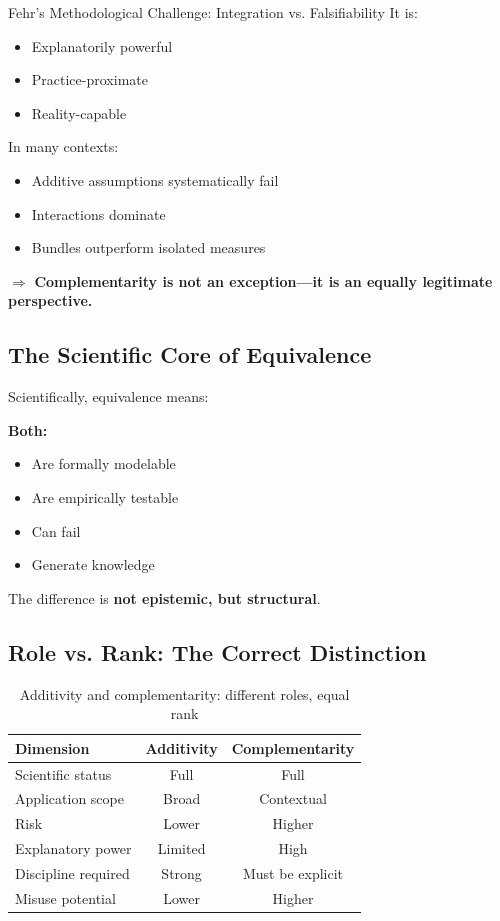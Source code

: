 \begin{chapter}{Fehr's Methodological Challenge: Integration vs. Falsifiability}
It is:
\begin{itemize}[noitemsep]
    \item Explanatorily powerful
    \item Practice-proximate
    \item Reality-capable
\end{itemize}

In many contexts:
\begin{itemize}[noitemsep]
    \item Additive assumptions systematically fail
    \item Interactions dominate
    \item Bundles outperform isolated measures
\end{itemize}

$\Rightarrow$ \textbf{Complementarity is not an exception---it is an equally legitimate perspective.}

\subsection{The Scientific Core of Equivalence}

Scientifically, equivalence means:

\textbf{Both:}
\begin{itemize}[noitemsep]
    \item Are formally modelable
    \item Are empirically testable
    \item Can fail
    \item Generate knowledge
\end{itemize}

The difference is \textbf{not epistemic, but structural}.

\subsection{Role vs. Rank: The Correct Distinction}

\begin{table}[h!]
\centering
\renewcommand{\arraystretch}{1.3}
\begin{tabular}{lcc}
\toprule
\textbf{Dimension} & \textbf{Additivity} & \textbf{Complementarity} \\
\midrule
Scientific status & Full & Full \\
Application scope & Broad & Contextual \\
Risk & Lower & Higher \\
Explanatory power & Limited & High \\
Discipline required & Strong & Must be explicit \\
Misuse potential & Lower & Higher \\
\bottomrule
\end{tabular}
\caption{Additivity and complementarity: different roles, equal rank}
\end{table}


\end{chapter}
